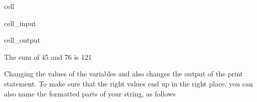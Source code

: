 \documentclass[letterpaper,10pt,english]{jupyterBook}
\begin{document}
\begin{sphinxuseclass}{cell}\begin{sphinxVerbatimInput}

\begin{sphinxuseclass}{cell_input}
\begin{sphinxVerbatim}[commandchars=\\\{\}]
  
  
  
\end{sphinxVerbatim}

\end{sphinxuseclass}\end{sphinxVerbatimInput}
\begin{sphinxVerbatimOutput}

\begin{sphinxuseclass}{cell_output}
\begin{sphinxVerbatim}[commandchars=\\\{\}]
The sum of 45 and 76 is 121
\end{sphinxVerbatim}

\end{sphinxuseclass}\end{sphinxVerbatimOutput}

\end{sphinxuseclass}
\sphinxAtStartPar
Changing the values of the variables  and  also changes the output of the print statement. To make sure that the right values end up in the right place, you can also name the formatted parts of your string, as follows
\end{document}
